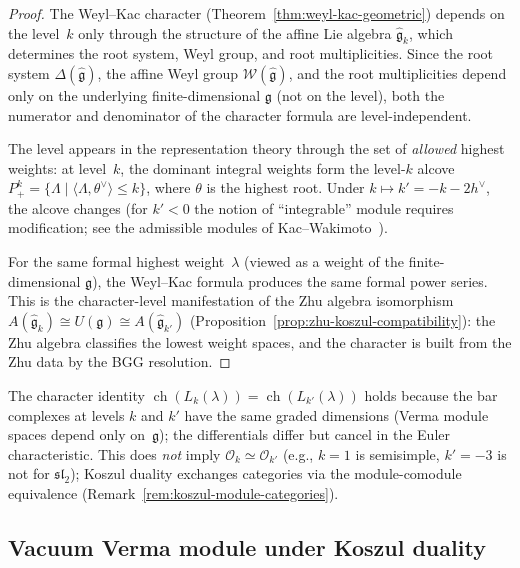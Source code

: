 \begin{proof}
The Weyl--Kac character (Theorem~\ref{thm:weyl-kac-geometric})
depends on the level~$k$ only through the structure of the
affine Lie algebra $\widehat{\mathfrak{g}}_k$, which determines
the root system, Weyl group, and root multiplicities.
Since the root system $\Delta(\widehat{\mathfrak{g}})$, the affine
Weyl group $\mathcal{W}(\widehat{\mathfrak{g}})$, and the root
multiplicities depend only on the underlying finite-dimensional
$\mathfrak{g}$ (not on the level), both the numerator and denominator
of the character formula are level-independent.

The level appears in the representation theory through the set of
\emph{allowed} highest weights: at level~$k$, the dominant integral
weights form the level-$k$ alcove
$P^k_+ = \{\Lambda \mid \langle \Lambda, \theta^\vee \rangle \leq k\}$,
where $\theta$ is the highest root.  Under $k \mapsto k' = -k-2h^\vee$,
the alcove changes (for $k' < 0$ the notion of ``integrable''
module requires modification; see the admissible
modules of Kac--Wakimoto~\cite{KW88}).

For the same formal highest weight~$\lambda$ (viewed as a weight of
the finite-dimensional $\mathfrak{g}$), the Weyl--Kac formula
produces the same formal power series.  This is the character-level
manifestation of the Zhu algebra isomorphism
$A(\widehat{\mathfrak{g}}_k) \cong U(\mathfrak{g}) \cong
A(\widehat{\mathfrak{g}}_{k'})$
(Proposition~\ref{prop:zhu-koszul-compatibility}):
the Zhu algebra classifies the lowest weight spaces, and the
character is built from the Zhu data by the BGG resolution.
\end{proof}

\begin{remark}
\label{rem:character-bar-cobar-duality}
The character identity $\operatorname{ch}(L_k(\lambda)) = \operatorname{ch}(L_{k'}(\lambda))$ holds because the bar complexes at levels $k$ and $k'$ have the same graded dimensions (Verma module spaces depend only on~$\mathfrak{g}$); the differentials differ but cancel in the Euler characteristic.  This does \emph{not} imply $\mathcal{O}_k \simeq \mathcal{O}_{k'}$ (e.g., $k = 1$ is semisimple, $k' = -3$ is not for $\mathfrak{sl}_2$); Koszul duality exchanges categories via the module-comodule equivalence (Remark~\ref{rem:koszul-module-categories}).
\end{remark}

\subsection{Vacuum Verma module under Koszul duality}
\label{sec:vacuum-koszul}

